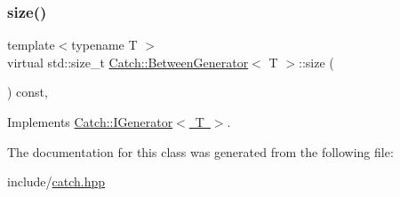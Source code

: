 \subsubsection{\texorpdfstring{size()}{size()}}
{\footnotesize\ttfamily template$<$typename T $>$ \\
virtual std\+::size\+\_\+t \mbox{\hyperlink{class_catch_1_1_between_generator}{Catch\+::\+Between\+Generator}}$<$ T $>$\+::size (\begin{DoxyParamCaption}{ }\end{DoxyParamCaption}) const\hspace{0.3cm}{\ttfamily [inline]}, {\ttfamily [virtual]}}



Implements \mbox{\hyperlink{struct_catch_1_1_i_generator_a2e317253b03e838b6065ce69719a198e}{Catch\+::\+I\+Generator$<$ T $>$}}.



The documentation for this class was generated from the following file\+:\begin{DoxyCompactItemize}
\item 
include/\mbox{\hyperlink{catch_8hpp}{catch.\+hpp}}\end{DoxyCompactItemize}
